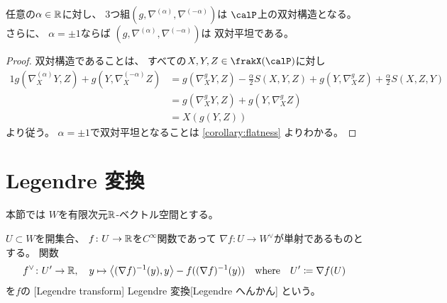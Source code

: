 \documentclass[report]{jlreq}
\begin{document}
\begin{theorem}
    任意の$\alpha \in \mathbb{R}$に対し、
    3つ組$(g, \nabla^{(\alpha)}, \nabla^{(-\alpha)})$は
    $\calP$上の双対構造となる。
    さらに、
    $\alpha = \pm 1$ならば
    $(g, \nabla^{(\alpha)}, \nabla^{(-\alpha)})$は
    双対平坦である。
\end{theorem}

\begin{proof}
    双対構造であることは、
    すべての$X, Y, Z \in \frakX(\calP)$に対し
    \begin{alignat}{1}
        g(\nabla^{(\alpha)}_X Y, Z)
            + g(Y, \nabla^{(-\alpha)}_X Z)
            &=
                g(\nabla^{g}_X Y, Z)
                - \frac{\alpha}{2} S(X, Y, Z)
                + g(Y, \nabla^{g}_X Z)
                + \frac{\alpha}{2} S(X, Z, Y)
                \\
            &=
                g(\nabla^{g}_X Y, Z)
                + g(Y, \nabla^{g}_X Z)
                \\
            &=
                X(g(Y, Z))
    \end{alignat}
    より従う。
    $\alpha = \pm 1$で双対平坦となることは
    \cref{corollary:flatness}
    よりわかる。
\end{proof}

%
\section{Legendre 変換}

本節では
$W$を有限次元$\mathbb{R}$-ベクトル空間とする。

\begin{definition}[Legendre 変換]
    $U \subset W$を開集合、
    $f \colon U \to \mathbb{R}$を$C^\infty$関数であって
    $\nabla f \colon U \to W^\vee$が単射であるものとする。
    関数
    \begin{equation}
        f^\vee \colon U' \to \mathbb{R},
            \quad
            y
            \mapsto
            \left\langle{(\nabla f)^{-1}(y)},{y}\right\rangle - f((\nabla f)^{-1}(y))
            \quad
            \text{where}
            \quad
            U' \coloneqq \nabla f(U)
    \end{equation}
    を$f$の
    [Legendre transform]
        {Legendre 変換}[Legendre へんかん]
    という。
\end{definition}
\end{document}
